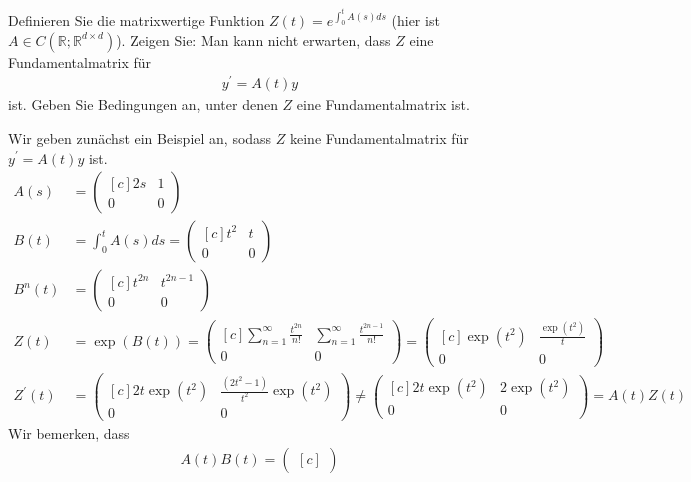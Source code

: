 \begin{exercise}
Definieren Sie die matrixwertige Funktion $Z(t) = e^{\int_0^tA(s)ds}$ (hier
ist $A \in C(\mathbb{R};\mathbb{R}^{d \times d})$). Zeigen Sie: Man kann nicht
erwarten, dass $Z$ eine Fundamentalmatrix für
\begin{align*}
  y^{\prime} = A(t)y
\end{align*}
ist. Geben Sie Bedingungen an, unter denen $Z$ eine Fundamentalmatrix ist.
\end{exercise}
\begin{solution}
Wir geben zunächst ein Beispiel an, sodass $Z$ keine Fundamentalmatrix für
$y^{\prime} = A(t)y$ ist.
\begin{align*}
  A(s) &= \begin{pmatrix*}[c]
    2s & 1 \\
    0 & 0
  \end{pmatrix*} \\
  B(t) &= \int_0^tA(s)ds = \begin{pmatrix*}[c]
    t^2 & t \\
    0 & 0
  \end{pmatrix*} \\
  B^n(t) &= \begin{pmatrix*}[c]
    t^{2n} & t^{2n-1} \\
    0 & 0
  \end{pmatrix*} \\
  Z(t) &= \exp(B(t)) = \begin{pmatrix*}[c]
    \sum_{n=1}^{\infty}\frac{t^{2n}}{n!} & \sum_{n=1}^{\infty}\frac{t^{2n-1}}{n!}\\
    0 & 0
  \end{pmatrix*}
  = \begin{pmatrix*}[c]
    \exp(t^2) & \frac{\exp(t^2)}{t}\\
    0 & 0
  \end{pmatrix*} \\
  Z^{\prime}(t) &= \begin{pmatrix*}[c]
    2t\exp(t^2) & \frac{(2t^2-1)}{t^2}\exp(t^2) \\
    0 & 0
  \end{pmatrix*}\neq
  \begin{pmatrix*}[c]
    2t\exp(t^2) & 2\exp(t^2)\\
    0 & 0
  \end{pmatrix*}
  = A(t)Z(t)
\end{align*}
Wir bemerken, dass
\begin{align*}
  A(t)B(t) =  \begin{pmatrix*}[c]

\end{pmatrix*}
\end{align*}
\end{solution}
